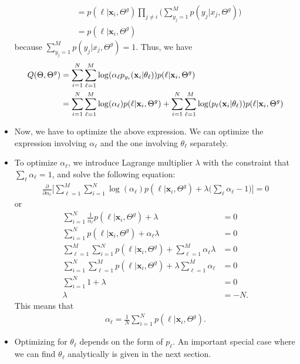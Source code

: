 \documentclass[10pt]{article}
\newcommand{\x}{\mathbf{x}}
\begin{document}
\begin{itemize}
\begin{align*}
      &= p(\ell|\x_i, \Theta^g) \prod_{j\neq i} \bigg( \sum_{y_j=1}^M p(y_j|x_j, \Theta^g) \bigg)\\
      &= p(\ell|\x_i,\Theta^g)
    \end{align*}
    because $\sum_{y_j=1}^M p(y_j|x_j, \Theta^g) = 1$. Thus, we have
    \begin{align} \label{expected-log}
      Q(\Theta, \Theta^g) 
      &= \sum_{i=1}^N \sum_{\ell=1}^M \log(\alpha_{\ell} p_{y_i}(\x_i|\theta_{\ell})) p(\ell|\x_i,\Theta^g) \notag \\
      &= \sum_{i=1}^N \sum_{\ell=1}^M \log(\alpha_{\ell}) p(\ell|\x_i,\Theta^g) + \sum_{i=1}^N \sum_{\ell=1}^M  \log(p_{\ell}(\x_i|\theta_{\ell}))p(\ell|\x_i,\Theta^g)
    \end{align}
    
    \item Now, we have to optimize the above expression. We can optimize the expression involving $\alpha_\ell$ and the one involving $\theta_\ell$ separately.
    
    \item To optimize $\alpha_\ell$, we introduce Lagrange multiplier $\lambda$ with the constraint that $\sum_\ell \alpha_\ell = 1$,
    and solve the following equation:
    \begin{align*}
      \frac{\partial}{\partial \alpha_\ell} \bigg[ \sum_{\ell=1}^M \sum_{i=1}^N \log(\alpha_\ell) p(\ell|\x_i, \Theta^g) + \lambda\bigg( \sum_\ell \alpha_\ell - 1\bigg) \bigg] = 0
    \end{align*}
    or
    \begin{align*}
      \sum_{i=1}^N \frac{1}{\alpha_\ell} p(\ell|\x_i,\Theta^g) + \lambda &= 0\\
      \sum_{i=1}^N p(\ell|\x_i,\Theta^g) + \alpha_\ell \lambda &= 0\\
      \sum_{\ell = 1}^M \sum_{i=1}^N p(\ell|\x_i,\Theta^g) + \sum_{\ell=1}^M \alpha_\ell \lambda &= 0\\
      \sum_{i=1}^N \sum_{\ell = 1}^M  p(\ell|\x_i,\Theta^g) + \lambda \sum_{\ell=1}^M \alpha_\ell  &= 0\\
      \sum_{i=1}^N 1 + \lambda &= 0\\
      \lambda &= -N.
    \end{align*}
    This means that
    \begin{align*}
      \alpha_\ell = \frac{1}{N} \sum_{i=1}^N p(\ell|\x_i,\Theta^g).
    \end{align*}
    
    \item Optimizing for $\theta_\ell$ depends on the form of $p_\ell$. An important special case where we can find $\theta_\ell$ analytically is given in the next section.
  \end{itemize}
  
\end{document}
